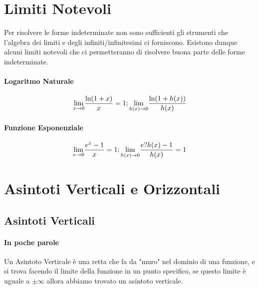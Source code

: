 \documentclass[12pt, a4paper, openany]{book}
\begin{document}
\section{Limiti Notevoli}
Per risolvere le forme indeterminate non sono sufficienti gli strumenti che l'algebra dei limiti e degli infiniti/infinitesimi ci forniscono.
Esistono dunque alcuni limiti notevoli che ci permetteranno di risolvere buona parte delle forme indeterminate.

\paragraph*{Logaritmo Naturale}
$$\underset{x \to 0}{\lim} \frac{\ln(1+x)}{x} = 1 ; \underset{h(x) \to 0}{\lim} \frac{\ln(1+h(x))}{h(x)}$$ 

\paragraph*{Funzione Esponenziale}
$$\underset{x \to 0}{\lim} \frac{e^x-1}{x} = 1; \underset{h(x) \to 0}{\lim} \frac{e?{h(x)-1}}{h(x)} = 1$$





\section{Asintoti Verticali e Orizzontali}
\subsection*{Asintoti Verticali}
\paragraph*{In poche parole} Un Asintoto Verticale è una retta che fa da "muro" nel dominio di una funzione, e si trova facendo il limite della funzione in un punto specifico, se questo limite è uguale a $\pm \infty$ allora abbiamo trovato un asintoto verticale.
\end{document}
